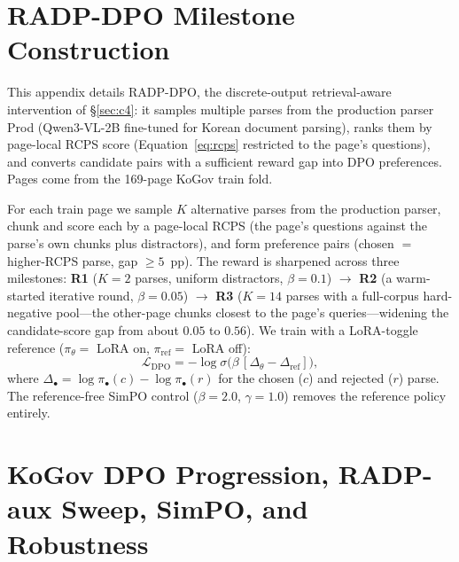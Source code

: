\documentclass[11pt]{article}
\newcommand{\rcps}{\textsc{RCPS}}
\begin{document}


\appendix

\section{RADP-DPO Milestone Construction}
\label{app:milestones}

This appendix details RADP-DPO, the discrete-output retrieval-aware intervention of \S\ref{sec:c4}: it samples multiple parses from the production parser Prod (Qwen3-VL-2B fine-tuned for Korean document parsing), ranks them by page-local \rcps{} score (Equation~\ref{eq:rcps} restricted to the page's questions), and converts candidate pairs with a sufficient reward gap into DPO preferences. Pages come from the 169-page KoGov train fold.

For each train page we sample $K$ alternative parses from the production parser, chunk and score each by a page-local \rcps{} (the page's questions against the parse's own chunks plus distractors), and form preference pairs (chosen $=$ higher-\rcps{} parse, gap $\ge 5$~pp). The reward is sharpened across three milestones: \textbf{R1} ($K = 2$ parses, uniform distractors, $\beta = 0.1$) $\rightarrow$ \textbf{R2} (a warm-started iterative round, $\beta = 0.05$) $\rightarrow$ \textbf{R3} ($K = 14$ parses with a full-corpus hard-negative pool---the other-page chunks closest to the page's queries---widening the candidate-score gap from about $0.05$ to $0.56$). We train with a LoRA-toggle reference ($\pi_\theta =$ LoRA on, $\pi_\text{ref} =$ LoRA off):
\begin{equation}
\mathcal{L}_\text{DPO} = -\log \sigma\big(\beta\,[\Delta_\theta - \Delta_\text{ref}]\big),
\end{equation}
where $\Delta_\bullet = \log \pi_\bullet(c) - \log \pi_\bullet(r)$ for the chosen ($c$) and rejected ($r$) parse.
The reference-free SimPO control ($\beta = 2.0$, $\gamma = 1.0$) removes the reference policy entirely.

\section{KoGov DPO Progression, RADP-aux Sweep, SimPO, and Robustness}
\label{app:dpo}
\end{document}
